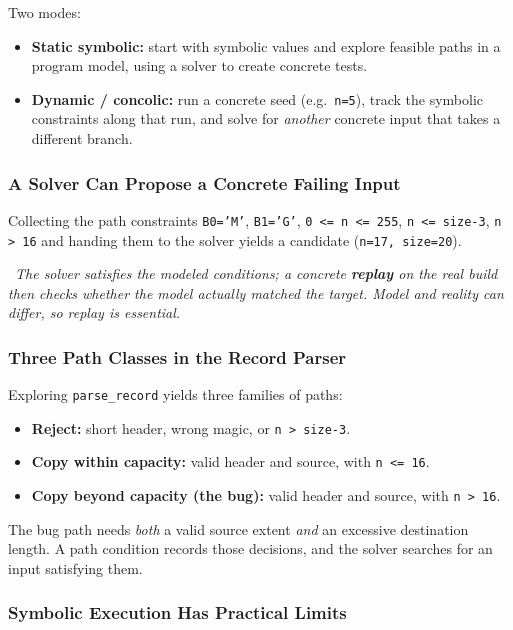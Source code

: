 \documentclass[hidelinks]{article}
\newcommand{\callout}[1]{\par\smallskip\noindent{\color{capri}$\blacktriangleright$}\ \textit{#1}\par\smallskip}
\begin{document}
Two modes:
\begin{itemize}
    \item \textbf{Static symbolic:} start with symbolic values and explore feasible paths in a program model, using a solver to create concrete tests.
    \item \textbf{Dynamic / concolic:} run a concrete seed (e.g.\ \texttt{n=5}), track the symbolic constraints along that run, and solve for \emph{another} concrete input that takes a different branch.
\end{itemize}

\subsubsection{A Solver Can Propose a Concrete Failing Input}

Collecting the path constraints \texttt{B0='M'}, \texttt{B1='G'}, \texttt{0 <= n <= 255}, \texttt{n <= size-3}, \texttt{n > 16} and handing them to the solver yields a candidate (\texttt{n=17, size=20}).

\callout{The solver satisfies the \emph{modeled} conditions; a concrete \textbf{replay} on the real build then checks whether the model actually matched the target. Model and reality can differ, so replay is essential.}

\subsubsection{Three Path Classes in the Record Parser}

Exploring \texttt{parse\_record} yields three families of paths:
\begin{itemize}
    \item \textbf{Reject:} short header, wrong magic, or \texttt{n > size-3}.
    \item \textbf{Copy within capacity:} valid header and source, with \texttt{n <= 16}.
    \item \textbf{Copy beyond capacity (the bug):} valid header and source, with \texttt{n > 16}.
\end{itemize}
The bug path needs \emph{both} a valid source extent \emph{and} an excessive destination length. A path condition records those decisions, and the solver searches for an input satisfying them.

\subsubsection{Symbolic Execution Has Practical Limits}
\end{document}
